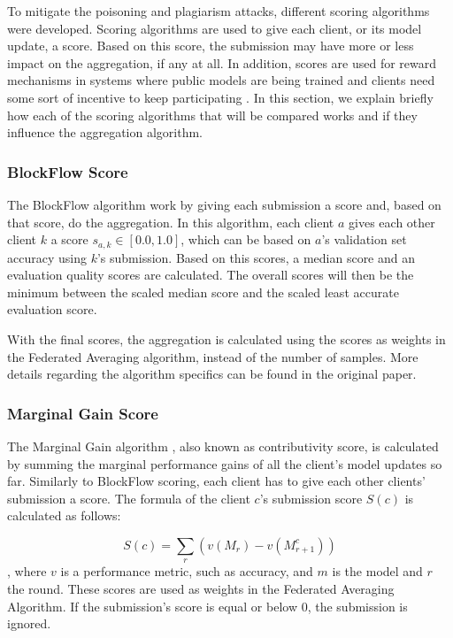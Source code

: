 To mitigate the poisoning and plagiarism attacks, different scoring algorithms were developed. Scoring algorithms are used to give each client, or its model update, a score. Based on this score, the submission may have more or less impact on the aggregation, if any at all. In addition, scores are used for reward mechanisms in systems where public models are being trained and clients need some sort of incentive to keep participating \cite{8945913, 8832210, 8905038, 9006344}. In this section, we explain briefly how each of the scoring algorithms that will be compared works and if they influence the aggregation algorithm.

\subsubsection{BlockFlow Score}

The BlockFlow algorithm \cite{10.48550/arxiv.2007.03856} work by giving each submission a score and, based on that score, do the aggregation. In this algorithm, each client $a$ gives each other client $k$ a score $s_{a,k} \in [0.0, 1.0]$, which can be based on $a$'s validation set accuracy using $k$'s submission. Based on this scores, a median score and an evaluation quality scores are calculated. The overall scores will then be the minimum between the scaled median score and the scaled least accurate evaluation score.

With the final scores, the aggregation is calculated using the scores as weights in the Federated Averaging algorithm, instead of the number of samples. More details regarding the algorithm specifics can be found in the original paper.

\subsubsection{Marginal Gain Score}

The Marginal Gain algorithm \cite{10.48550/arxiv.2011.07516}, also known as contributivity score, is calculated by summing the marginal performance gains of all the client's model updates so far. Similarly to BlockFlow scoring, each client has to give each other clients' submission a score. The formula of the client $c$'s submission score $S(c)$ is calculated as follows:

\begin{equation}
    \label{eq:marginal-gain}
    S(c)= \sum_r(v(M_r)-v(M^c_{r+1}))
\end{equation}
, where $v$ is a performance metric, such as accuracy, and $m$ is the model and $r$ the round. These scores are used as weights in the Federated Averaging Algorithm. If the submission's score is equal or below $0$, the submission is ignored.

